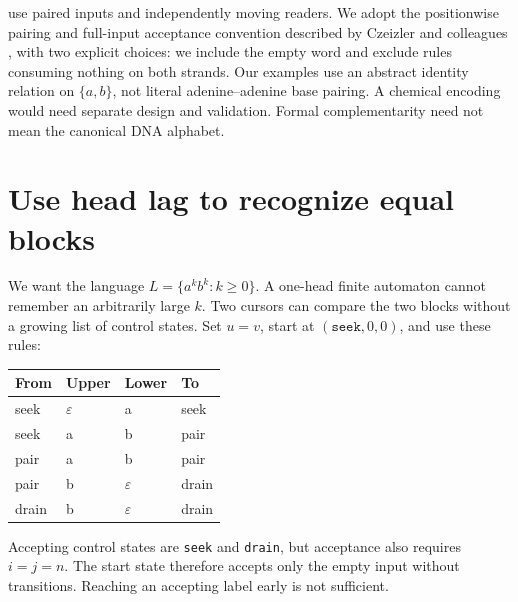 
 use paired inputs and independently moving
readers. We adopt the positionwise pairing and full-input acceptance convention
described by Czeizler and colleagues \cite{Czeizler2009}, with two explicit choices:
we include the empty word and exclude rules consuming nothing on both strands.
Our examples use an abstract identity relation on $\{a,b\}$, not literal
adenine--adenine base pairing. A chemical encoding would need separate design
and validation. Formal complementarity need not mean the canonical DNA alphabet.

\section{Use head lag to recognize equal blocks}
We want the language $L=\{a^k b^k:k\geq0\}$. A one-head finite automaton
cannot remember an arbitrarily large $k$. Two cursors can compare the two
blocks without a growing list of control states. Set $u=v$, start at
$(\texttt{seek},0,0)$, and use these rules:
\begin{center}
\begin{tabular}{llll}\toprule
From & Upper & Lower & To\\\midrule
seek & $\varepsilon$ & a & seek\\
seek & a & b & pair\\
pair & a & b & pair\\
pair & b & $\varepsilon$ & drain\\
drain & b & $\varepsilon$ & drain\\\bottomrule
\end{tabular}\end{center}
Accepting control states are \texttt{seek} and \texttt{drain}, but acceptance
also requires $i=j=n$. The start state therefore accepts only the empty input
without transitions. Reaching an accepting label early is not sufficient.


